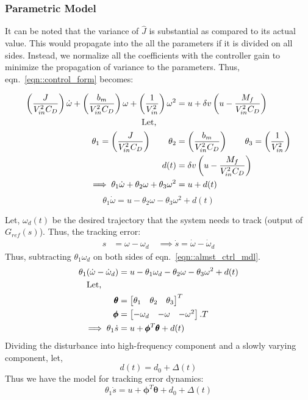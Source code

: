 \subsubsection{Parametric Model}
It can be noted that the variance of $\hat J$ is substantial as compared to its
actual value. This would propagate into the all the parameters if it is divided
on all sides. Instead, we normalize all the coefficients with the controller
gain to minimize the propagation of variance to the parameters. Thus,
eqn.~\ref{eqn::control_form} becomes:

\begin{align*}
    \left( \frac{J}{V_{in}^2 C_D} \right) \dot \omega + \left( \frac{b_m}{V_{in}^2 C_D} \right) \omega + \left( \frac{1}{V_{in}^2} \right) \omega^2  &= u + \delta v \left( u - \frac{M_f}{V_{in}^2 C_D} \right)\\
    \text{Let, } \qquad &\\
    \theta_1 = \left( \frac{J}{V_{in}^2 C_D} \right) \qquad
    \theta_2 &= \left( \frac{b_m}{V_{in}^2 C_D} \right)\qquad
    \theta_3 = \left( \frac{1}{V_{in}^2} \right)\\
    d(t) &= \delta v \left( u - \frac{M_f}{V_{in}^2 C_D} \right)\\
    \implies \theta_1 \dot \omega + \theta_2 \omega + \theta_3 \omega^2 &= u + d(t)
\end{align*}
\begin{equation}\label{eqn::almst_ctrl_mdl}
    \theta_1 \dot \omega = u - \theta_2 \omega - \theta_3 \omega^2 + d(t)
\end{equation}

Let, $\omega_d(t)$ be the desired trajectory that the system needs to track
(output of $G_{ref}(s)$). Thus, the tracking error:
\begin{align*}
    s &= \omega - \omega_d \quad \implies \dot s = \dot \omega - \dot \omega_d
\end{align*}
Thus, subtracting $\theta_1 \omega_d$ on both sides of eqn.~\ref{eqn::almst_ctrl_mdl}.
\begin{align*}
    \theta_1 (\dot \omega - \dot \omega_d) &= u - \theta_1 \omega_d - \theta_2 \omega - \theta_3 \omega^2 + d(t)\\
    \text{Let,} \qquad\\
    \pmb \theta &= \begin{bmatrix} \theta_1 & \theta_2 & \theta_3 \end{bmatrix}^T\\
    \pmb \phi &= \begin{bmatrix} -\omega_d & -\omega & - \omega^2 \end{bmatrix}.T\\
    \implies \theta_1 \dot s &= u + \pmb \phi^T \pmb \theta + d(t)
\end{align*}
Dividing the disturbance into high-frequency component and a slowly varying
component, let, $$d(t) = d_0 + \Delta(t)$$
Thus we have the model for tracking error dynamics:
\begin{equation}\label{eqn::error_dyn}
    \theta_1 \dot s = u + \pmb \phi^T \pmb \theta + d_0 + \Delta(t)
\end{equation}



